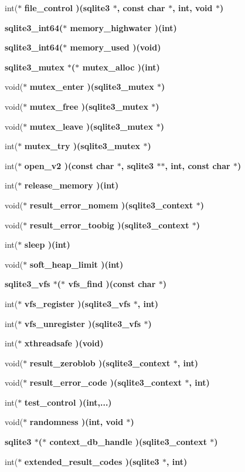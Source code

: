 \begin{CompactItemize}
\item 
int($\ast$ \bf{file\_\-control} )(\bf{sqlite3} $\ast$, const char $\ast$, int, void $\ast$)
\item 
\bf{sqlite3\_\-int64}($\ast$ \bf{memory\_\-highwater} )(int)
\item 
\bf{sqlite3\_\-int64}($\ast$ \bf{memory\_\-used} )(void)
\item 
\bf{sqlite3\_\-mutex} $\ast$($\ast$ \bf{mutex\_\-alloc} )(int)
\item 
void($\ast$ \bf{mutex\_\-enter} )(\bf{sqlite3\_\-mutex} $\ast$)
\item 
void($\ast$ \bf{mutex\_\-free} )(\bf{sqlite3\_\-mutex} $\ast$)
\item 
void($\ast$ \bf{mutex\_\-leave} )(\bf{sqlite3\_\-mutex} $\ast$)
\item 
int($\ast$ \bf{mutex\_\-try} )(\bf{sqlite3\_\-mutex} $\ast$)
\item 
int($\ast$ \bf{open\_\-v2} )(const char $\ast$, \bf{sqlite3} $\ast$$\ast$, int, const char $\ast$)
\item 
int($\ast$ \bf{release\_\-memory} )(int)
\item 
void($\ast$ \bf{result\_\-error\_\-nomem} )(\bf{sqlite3\_\-context} $\ast$)
\item 
void($\ast$ \bf{result\_\-error\_\-toobig} )(\bf{sqlite3\_\-context} $\ast$)
\item 
int($\ast$ \bf{sleep} )(int)
\item 
void($\ast$ \bf{soft\_\-heap\_\-limit} )(int)
\item 
\bf{sqlite3\_\-vfs} $\ast$($\ast$ \bf{vfs\_\-find} )(const char $\ast$)
\item 
int($\ast$ \bf{vfs\_\-register} )(\bf{sqlite3\_\-vfs} $\ast$, int)
\item 
int($\ast$ \bf{vfs\_\-unregister} )(\bf{sqlite3\_\-vfs} $\ast$)
\item 
int($\ast$ \bf{xthreadsafe} )(void)
\item 
void($\ast$ \bf{result\_\-zeroblob} )(\bf{sqlite3\_\-context} $\ast$, int)
\item 
void($\ast$ \bf{result\_\-error\_\-code} )(\bf{sqlite3\_\-context} $\ast$, int)
\item 
int($\ast$ \bf{test\_\-control} )(int,...)
\item 
void($\ast$ \bf{randomness} )(int, void $\ast$)
\item 
\bf{sqlite3} $\ast$($\ast$ \bf{context\_\-db\_\-handle} )(\bf{sqlite3\_\-context} $\ast$)
\item 
int($\ast$ \bf{extended\_\-result\_\-codes} )(\bf{sqlite3} $\ast$, int)
$$
\end{CompactItemize}
